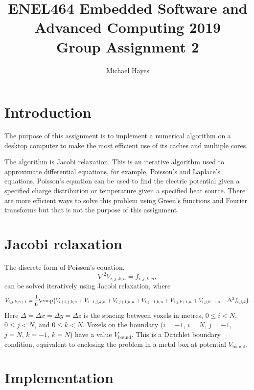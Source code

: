 \documentclass[a4paper,11pt]{article}
\begin{document}
\title{ \bf ENEL464 Embedded Software and Advanced Computing 2019 \\ Group Assignment 2}
\author{Michael Hayes}
\date{}
\maketitle


\section{Introduction}

The purpose of this assignment is to implement a numerical algorithm
on a desktop computer to make the most efficient use of its caches and
multiple cores.

The algorithm is Jacobi relaxation.  This is an iterative algorithm
used to approximate differential equations, for example, Poisson's and
Laplace's equations.  Poisson's equation can be used to find the
electric potential given a specified charge distribution or
temperature given a specified heat source.  There are more efficient
ways to solve this problem using Green's functions and Fourier
transforms but that is not the purpose of this assignment.

\section{Jacobi relaxation}

The discrete form of Poisson's equation,
%
\begin{equation}
  \nabla^2 V_{i,j,k,n} = f_{i,j,k,n},
\end{equation}
%
can be solved iteratively using Jacobi relaxation, where
%
\begin{equation}
  V_{i,j,k,n+1} = \frac{1}{6}\encp{V_{i+1,j,k,n} + V_{i-1,j,k,n} + V_{i,j+1,k,n} + V_{i,j-1,k,n} + V_{i,j,k+1,n} + V_{i,j,k-1,n} - \Delta^2 f_{i,j,k}}.
\label{eqn:Jacobi}
\end{equation}
%
Here $\Delta = \Delta x = \Delta y = \Delta z$ is the spacing between
voxels in metres, $0 \le i < N$, $0 \le j < N$, and $0 \le k < N$.
Voxels on the boundary ($i = -1$, $i=N$, $j = -1$, $j=N$, $k = -1$,
$k=N$) have a value $V_{\mathrm{bound}}$.  This is a Dirichlet
boundary condition, equivalent to enclosing the problem in a metal box
at potential $V_{\mathrm{bound}}$.

\section{Implementation}
\end{document}
